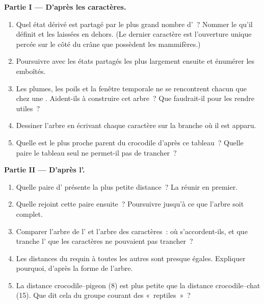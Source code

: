 \begin{problem}
\medskip
\noindent\textbf{Partie I --- D'après les caractères.}
\begin{enumerate}
  \item Quel état dérivé est partagé par le plus grand nombre
        d'~? Nommer le  qu'il définit et les 
        laissées en dehors. (Le dernier caractère est l'ouverture
        unique percée sur le côté du crâne que possèdent les
        mammifères.)
  \item Poursuivre avec les états partagés les plus largement
        ensuite et énumérer les  emboîtés.
  \item Les plumes, les poils et la fenêtre temporale ne se
        rencontrent chacun que chez une . Aident-ils à
        construire cet arbre~? Que faudrait-il pour les rendre
        utiles~?
  \item Dessiner l'arbre en écrivant chaque caractère sur la branche
        où il est apparu.
  \item Quelle  est le plus proche parent du crocodile d'après
        ce tableau~? Quelle paire le tableau seul ne permet-il pas de
        trancher~?
\end{enumerate}

\medskip
\noindent\textbf{Partie II --- D'après l'.}
\begin{enumerate}[resume]
  \item Quelle paire d' présente la plus petite distance~? La
        réunir en premier.
  \item Quelle  rejoint cette paire ensuite~? Poursuivre jusqu'à
        ce que l'arbre soit complet.
  \item Comparer l'arbre de l' et l'arbre des caractères~: où
        s'accordent-ils, et que tranche l' que les caractères ne
        pouvaient pas trancher~?
  \item Les distances du requin à toutes les autres  sont
        presque égales. Expliquer pourquoi, d'après la forme de
        l'arbre.
  \item La distance crocodile--pigeon (8) est plus petite que la
        distance crocodile--chat (15). Que dit cela du groupe courant
        des «~reptiles~»~?
\end{enumerate}


\end{problem}
